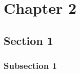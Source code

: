 
\chapter{Chapter 2}\label{chapters:chapter_2}
\vspace{-7mm}

\section{Section 1}\label{sec:ch_2_sec_1}

\subsection{Subsection 1}\label{subsec:subsec_2.1.1}


\clearpage

